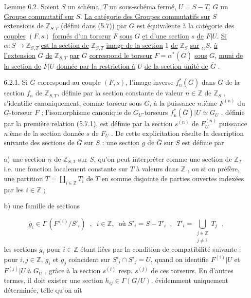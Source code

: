 \underline{Lemme} 6.2. \underline{Soient} $S$ \underline{un schéma}, $T$ \underline{un sous-schéma fermé}, $U = S-T$, $G$ \underline{un Groupe commutatif sur} $S$. \underline{La catégorie des Groupes commutatifs sur} $S$ \underline{extensions de} $\mathbb{Z}_{S,T}$ (\underline{défini dans} (5.7)) \underline{par} $G$ \underline{est équivalente à la catégorie des couples} $(F,s)$ \underline{formés d'un torseur} $F$ \underline{sous} $G$ \underline{et d'une section} $s$ \underline{de} $F|U$. \underline{Si} $\alpha : S \longrightarrow \mathbb{Z}_{S,T}$ \underline{est la section de} $\mathbb{Z}_{S,T}$ \underline{image de la section} $1$ \underline{de} $\mathbb{Z}_S$ \underline{sur} ${}_{\overline{G}}S$, \underline{à l'extension} $\overline{G}$ \underline{de} $\mathbb{Z}_{S,T}$ \underline{par} $G$ \underline{correspond le torseur} $F = \alpha^*(\overline{G})$ \underline{sous} $G$, \underline{muni de la section de} $F|U$ \underline{donnée par la restriction à} $U$ \underline{de la section unité de} $\overline{G}$ .



6.2.1. Si $\overline{G}$ correspond au couple $(F,s)$, l'image inverse $f^*_n(\overline{G})$ dans $\overline{G}$ de la section $f_n$ de $\mathbb{Z}_{S,T}$, définie par la section constante de valeur $n \in \mathbb{Z}$ de $\mathbb{Z}_S$ , s'identifie canoniquement, comme torseur sous $G$, à la puissance $n$.ième $F^{(n)}$ du $G$-torseur $F$ ; l'isomorphisme canonique de $G_U$-torseurs $f^*_n(\overline{G})|U \simeq G_U$ , définie par la première relation (5.7.1), est définie par la section $s^{(n)}$ de $F^{(n)}_U$ puissance $n$.ème de la section donnée $s$ de $F_U$ . De cette explicitation résulte la description suivante des sections de $\overline{G}$ sur $S$ : une section $\overline{g}$ de $\overline{G}$ sur $S$ est définie par

a) une section $\underline{n}$ de $\mathbb{Z}_{S,T}$ sur $S$, qu'on peut interpréter comme une section de $\mathbb{Z}_T$ i.e. une fonction localement constante sur $T$ à valeurs dans $\mathbb{Z}$ , ou si on préfère, une partition $T = \coprod\limits_{i \in \mathbb{Z}} T_i$ de $T$ en somme disjointe de parties ouvertes indexées par les $i \in \mathbb{Z}$ ;

b) une famille de sections

\begin{equation*}
\overline{g}_i \in \Gamma\,(F^{(i)}/S'_i) \;\;,\;\; i \in \mathbb{Z},\;\; \text{où } S'_i = S - T'_i \;\;,\;\; T'_i = \bigcup_{\substack{j \in \mathbb{Z} \\ j \neq i}} T_j \;\;,
\end{equation*}
les sections $\overline{g}_i$ pour $i \in \mathbb{Z}$ étant liées par la condition de compatibilité suivante : pour $i,j \in \mathbb{Z}$, $g_i$ et $g_j$ coïncident sur $S'_i \cap S'_j = U$, quand on identifie $F^{(i)}|U$ et $F^{(j)}|U$ à $G_U$ , grâce à la section $s^{(i)}$ resp. $s^{(j)}$ de ces torseurs. En d'autres termes, il doit exister une section $h_{ij} \in \Gamma(G/U)$, évidemment uniquement déterminée, telle qu'on ait


